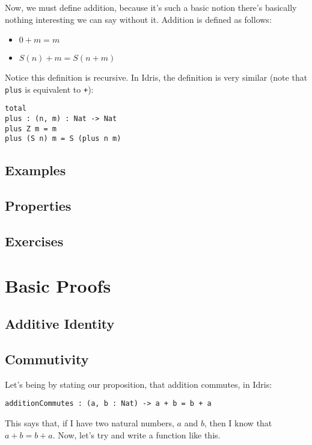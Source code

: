 \documentclass{article}
\newcommand{\inline}[1]{\texttt{#1}}
\begin{document}
Now, we must define addition, because it's such a basic notion there's basically nothing interesting we can say without it.
Addition is defined as follows:

\begin{itemize}
    \item[] $0 + m = m$
    \item[] $S(n) + m = S(n + m)$
\end{itemize}

Notice this definition is recursive.
In Idris, the definition is very similar (note that \inline{plus} is equivalent to \inline{+}):

\begin{verbatim}
total
plus : (n, m) : Nat -> Nat
plus Z m = m
plus (S n) m = S (plus n m)
\end{verbatim}

\subsection{Examples}

\subsection{Properties}

\subsection{Exercises}

\section{Basic Proofs}
\subsection{Additive Identity}

\subsection{Commutivity}
Let's being by stating our proposition, that addition commutes, in Idris:

\begin{verbatim}
additionCommutes : (a, b : Nat) -> a + b = b + a
\end{verbatim}

This says that, if I have two natural numbers, $a$ and $b$, then I know that $a + b = b + a$.
Now, let’s try and write a function like this.
\end{document}
